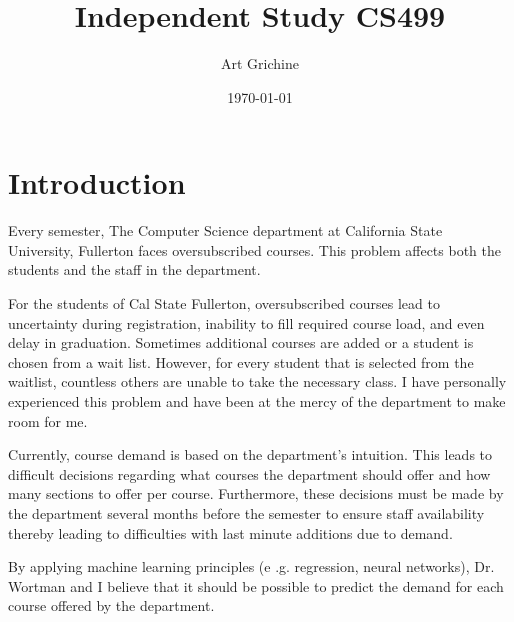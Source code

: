 \documentclass[12pt]{article}
\begin{document}
\title{Independent Study CS499}
\author{Art Grichine}
\date{\today}

\maketitle	

\newpage


\section*{Introduction}
Every semester, The Computer Science department at California State University, Fullerton faces 
oversubscribed courses. This problem affects both the students and the staff in the department. 

For the students of Cal State Fullerton, oversubscribed courses lead to uncertainty during registration, 
inability to fill required course load, and even delay in graduation. Sometimes additional courses are 
added or a student is chosen from a wait list. However, for every student that is selected from the 
waitlist, countless others are unable to take the necessary class. I have personally experienced this 
problem and have been at the mercy of the department to make room for me.

Currently, course demand is based on the department's intuition. This leads to difficult decisions 
regarding what courses the department should offer and how many sections to offer per course. 
Furthermore, these decisions must be made by the department several months before the semester 
to ensure staff availability thereby leading to difficulties with last minute additions due to demand.

By applying machine learning principles (e .g. regression, neural networks), Dr. Wortman and I believe 
that it should be possible to predict the demand for each course offered by the department.

\end{document}
